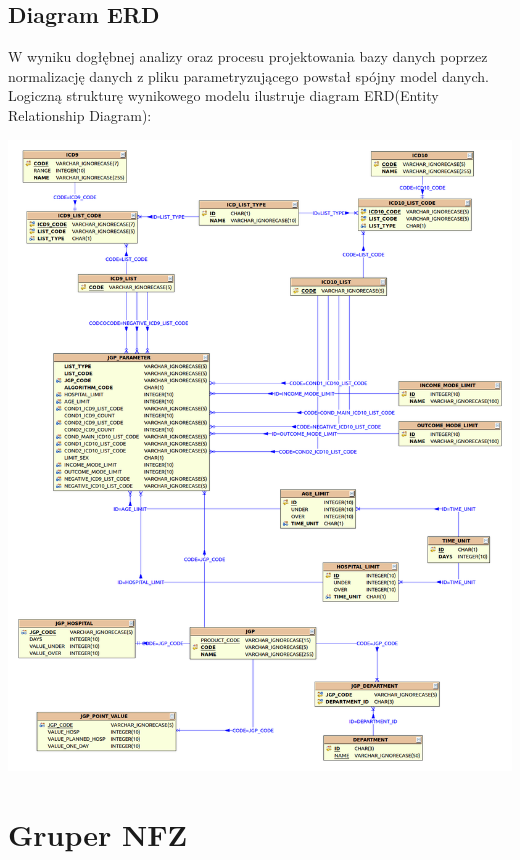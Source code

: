 \subsection{Diagram ERD}
\label{sec:diagramERD}

W wyniku dogłębnej analizy oraz procesu projektowania bazy danych poprzez normalizację danych z pliku parametryzującego powstał spójny model danych. Logiczną strukturę wynikowego modelu ilustruje diagram ERD(Entity Relationship Diagram):

\includegraphics[scale=0.31]{images/erd}

\section{Gruper NFZ}
\label{sec:gruperNFZ}

